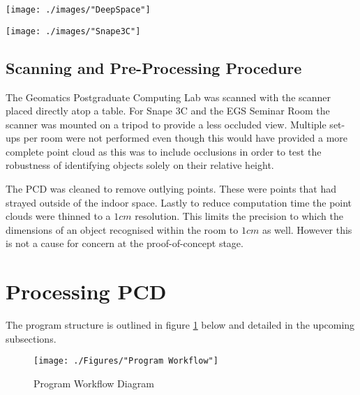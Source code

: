 \begin{sidewaysfigure}[h!]
	\centering
	\texttt{[image: ./images/"DeepSpace"]}
	\caption{A point cloud representation of the Geomatics Postgrad Lab.\label{DeepSpace}}
\end{sidewaysfigure}

\begin{sidewaysfigure}[h!]
	\centering
	\texttt{[image: ./images/"Snape3C"]}
	\caption{A point cloud representation of the newly constructred Snape 3C classroom.\label{Snape3C}}
\end{sidewaysfigure}
\clearpage

\subsection{Scanning and Pre-Processing Procedure}
The Geomatics Postgraduate Computing Lab was scanned with the scanner placed directly atop a table. For Snape 3C and the EGS Seminar Room the scanner was mounted on a tripod to provide a less occluded view. Multiple set-ups per room were not performed even though this would have provided a more complete point cloud as this was to include occlusions in order to test the robustness of identifying objects solely on their relative height. 

The PCD was cleaned to remove outlying points. These were points that had strayed outside of the indoor space. Lastly to reduce computation time the point clouds were thinned to a $1cm$ resolution. This limits the precision to which the dimensions of an object recognised within the room to $1cm$ as well. However this is not a cause for concern at the proof-of-concept stage. 

\section{Processing PCD}

The program structure is outlined in figure \ref{outline} below and detailed in the upcoming subsections.
\vspace{1.5cm}
\begin{figure}[h!]
	\centering
	\texttt{[image: ./Figures/"Program Workflow"]}
	\caption{Program Workflow Diagram \label{outline}}
\end{figure}
\clearpage
